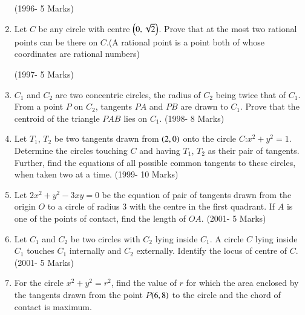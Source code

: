 \documentclass[journal,12pt,twocolumn]{IEEEtran}
\theoremstyle{remark}
\begin{document}
\begin{enumerate}
\hfill(1996- 5 Marks)\\





\item Let $C$ be any circle with centre $\left(0,\sqrt{2}\right)$. Prove that at the most two rational points can be there on $C$.(A rational point is a point both of whose coordinates are rational numbers)
	           
\hfill(1997- 5 Marks)\\




\item $C_{1}$ and $C_{2}$ are two concentric circles, the radius of $C_{2}$ being twice that of $C_{1}$. From a point $P$ on $C_{2}$, tangents $PA$ and $PB$ are drawn to $C_{1}$. Prove that the centroid of the triangle $PAB$ lies on $C_{1}$.
	           \hfill(1998- 8 Marks)\\




\item Let $T_{1}$, $T_{2}$ be two tangents drawn from $\left(2,0\right)$ onto the circle $C$:$x^2+y^2=1$. Determine the circles touching $C$ and having $T_{1}$, $T_{2}$ as their pair of tangents. Further, find the equations of all possible common tangents to these circles, when taken two at a time.
                  \hfill(1999- 10 Marks)\\




\item Let $2x^2+y^2-3xy=0$ be the equation of pair of tangents drawn from the origin $O$ to a circle of radius 3 with the centre in the first quadrant. If $A$ is one of the points of contact, find the length of $OA$.                   \hfill(2001- 5 Marks)\\




\item Let $C_{1}$ and $C_{2}$ be two circles with $C_{2}$ lying inside $C_{1}$. A circle $C$ lying inside $C_{1}$ touches $C_{1}$ internally and $C_{2}$ externally. Identify the locus of centre of $C$.                                \hfill(2001- 5 Marks)\\



\item For the circle $x^2+y^2=r^2$, find the value of $r$ for which the area enclosed by the tangents drawn from the point $P$$\left(6,8\right)$ to the circle and the chord of contact is maximum.



\end{enumerate}
\end{document}
